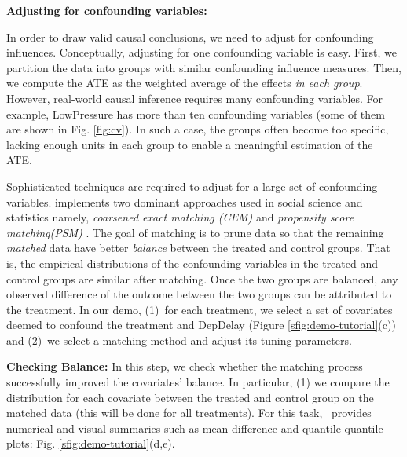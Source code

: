  {\bf Adjusting for confounding variables:} {
In order to draw valid causal conclusions, we need to adjust for confounding influences.
Conceptually, adjusting for one confounding variable is easy.  First, we partition the data into groups with similar confounding influence measures.
 Then, we compute the ATE as the weighted average of the effects \emph{in each group}.
 However, real-world causal inference requires many confounding variables.
  For example, LowPressure has more than ten confounding variables
 (some of them are shown in Fig. \ref{fig:cv}).
 In such a case, the groups often become too specific, lacking enough units in each group to enable a meaningful estimation of the ATE.


 Sophisticated techniques are required to adjust for a large set of confounding variables. \GSQL
 implements two dominant approaches used in social science and statistics namely,
  {\em coarsened exact matching (CEM)} and {\it propensity score matching(PSM)}
 \cite{IacKinPor09,Rubin1983b}.
 The goal of matching is to prune data so that
the remaining {\em matched} data have better \emph{balance}
between the treated and control groups. That is, the empirical
distributions of the confounding variables in the treated and control
groups are similar after matching.
Once the two groups are balanced, any observed difference of the
outcome between the two groups can be attributed to the treatment. In
our demo, (1)\ for each treatment, we select a set of covariates
deemed to confound the treatment and DepDelay (Figure \ref{sfig:demo-tutorial}(c)) and
  (2)\ we select a matching method and adjust its tuning parameters.



{\bf Checking Balance:}  In this step, we check whether the
matching process  successfully improved the covariates' balance. In particular,
(1)  we compare the distribution for each covariate between the
 treated and control group on the matched data
 (this will be done for all treatments). For this task, \GSQL\  provides
 numerical and visual summaries such as mean difference and quantile-quantile plots:
  Fig. \ref{sfig:demo-tutorial}(d,e). 


}
